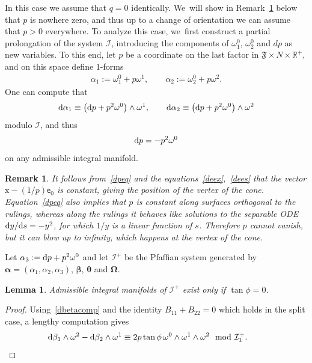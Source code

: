 \documentclass[pdftex]{sigma}
\def\R{\mathbb{R}}
\def\ve{\mathsf{e}}
\def\vx{\boldsymbol{\mathrm{x}}}
\def\vOmega{\boldsymbol{\Omega}}
\def\vbeta{\boldsymbol{\beta}}
\def\vtheta{\boldsymbol{\theta}}
\def\valpha{\boldsymbol{\alpha}}
\def\vOmega{\boldsymbol{\Omega}}
\def\F{\mathfrak{F}}
\def\calI{\mathcal{I}}
\def\w{\omega}
\newtheorem{Lemma}[Theorem]{Lemma}
\newtheorem{Remark}[Theorem]{Remark}}
\numberwithin{equation}{section}
\begin{document}
In this case we assume that $q=0$ identically. We~will show in Remark~\ref{prmk} below that $p$ is nowhere zero, and thus up to a change of orientation we can assume that $p > 0$ everywhere. To analyze this case, we~first construct a partial prolongation of the system $\calI$, introducing the components of $\w^0_1$, $\w^0_2$ and $dp$ as new variables.
To this end, let $p$ be a coordinate on the last factor in $\F\times N\times \R^+$, and on this space define $1$-forms
\begin{gather} \label{coneadd78}
\alpha_1 := \w^0_1 + p \w^1, \qquad \alpha_2 := \w^0_2 + p\w^2.
\end{gather}
One can compute that
\begin{gather*}
{\rm d}\alpha_1 \equiv \big({\rm d}p+p^2 \w^0\big)\wedge \w^1, \qquad
{\rm d}\alpha_2 \equiv \big({\rm d}p+p^2 \w^0\big)\wedge \w^2
\end{gather*}
modulo $\calI$, and thus
\begin{gather} \label{dpeq}
{\rm d}p = -p^2 \w^0
\end{gather}
on any admissible integral manifold.

\begin{Remark} \label{prmk}
It follows from~\eqref{dpeq} and the equations~\eqref{deex},~\eqref{dees} that the vector $\vx - (1/p) \ve_0$ is constant, giving the position of the vertex of the cone. Equation~\eqref{dpeq} also implies that $p$ is constant along surfaces orthogonal to the rulings, whereas along the rulings it behaves like solutions to the separable ODE ${\rm d}y/{\rm d}s = -y^2$, for which $1/y$ is a linear function of $s$. Therefore $p$ cannot vanish, but it can blow up to infinity, which happens at the vertex of the cone.
\end{Remark}

Let $\alpha_3 := {\rm d}p+p^2 \w^0$ and let $\calI^+$ be the Pfaffian system generated by $\valpha=(\alpha_1,\alpha_2,\alpha_3)$, $\vbeta$, $\vtheta$ and $\vOmega$.

\begin{Lemma} \label{conelemma}
Admissible integral manifolds of $\calI^+$ exist only if $\tan\phi=0$.
\end{Lemma}
\begin{proof}
Using~\eqref{dbetacomp} and the identity $B_{11} + B_{22} = 0$ which holds in the split case, a lengthy computation gives
\begin{gather*}
{\rm d}\beta_1 \wedge \w^2 - {\rm d}\beta_2 \wedge \w^1 \equiv 2p \tan\phi \, \w^0 \wedge \w^1 \wedge \w^2 \mod \calI^+_1. \tag*{\qed}
\end{gather*}
\renewcommand{\qed}{}
\end{proof}
\end{document}
